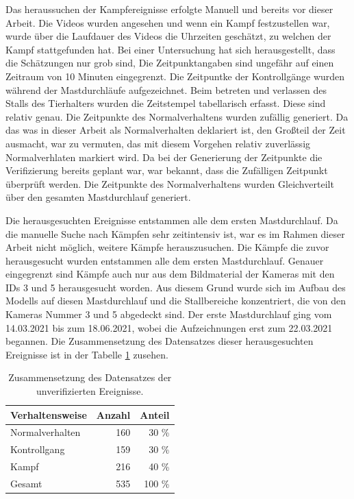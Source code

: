 Das heraussuchen der Kampfereignisse erfolgte Manuell und bereits vor dieser Arbeit. Die Videos wurden angesehen und wenn ein Kampf festzustellen war, wurde über die Laufdauer des Videos die Uhrzeiten geschätzt, zu welchen der Kampf stattgefunden hat. Bei einer Untersuchung hat sich herausgestellt, dass die Schätzungen nur grob sind, Die Zeitpunktangaben sind ungefähr auf einen Zeitraum von 10 Minuten eingegrenzt. Die Zeitpuntke der Kontrollgänge wurden während der Mastdurchläufe aufgezeichnet. Beim betreten und verlassen des Stalls des Tierhalters wurden die Zeitstempel tabellarisch erfasst. Diese sind relativ genau. Die Zeitpunkte des Normalverhaltens wurden zufällig generiert. Da das was in dieser Arbeit als Normalverhalten deklariert ist, den Großteil der Zeit ausmacht, war zu vermuten, das mit diesem Vorgehen relativ zuverlässig Normalverhlaten markiert wird. Da bei der Generierung der Zeitpunkte die Verifizierung bereits geplant war, war bekannt, dass die Zufälligen Zeitpunkt überprüft werden. Die Zeitpunkte des Normalverhaltens wurden Gleichverteilt über den gesamten Mastdurchlauf generiert.\par

Die herausgesuchten Ereignisse entstammen alle dem ersten Mastdurchlauf. Da die manuelle Suche nach Kämpfen sehr zeitintensiv ist, war es im Rahmen dieser Arbeit nicht möglich, weitere Kämpfe herauszusuchen. Die Kämpfe die zuvor herausgesucht wurden entstammen alle dem ersten Mastdurchlauf. Genauer eingegrenzt sind Kämpfe auch nur aus dem Bildmaterial der Kameras mit den IDs 3 und 5 herausgesucht worden. Aus diesem Grund wurde sich im Aufbau des Modells auf diesen Mastdurchlauf und die Stallbereiche konzentriert, die von den Kameras Nummer 3 und 5 abgedeckt sind. Der erste Mastdurchlauf ging vom 14.03.2021 bis zum 18.06.2021, wobei die Aufzeichnungen erst zum 22.03.2021 begannen.  Die Zusammensetzung des Datensatzes dieser herausgesuchten Ereignisse ist in der Tabelle \ref{tab:DataSetUnVeri} zusehen.\par


\begin{table}[ht]
    \centering
    \caption{Zusammensetzung des Datensatzes der unverifizierten Ereignisse.}
    \begin{tabular}{|l|r|r|}
    \hline
        Verhaltensweise & Anzahl & Anteil \\
    \hline
        Normalverhalten & 160 & 30 \%\\
        Kontrollgang & 159 & 30 \%\\
        Kampf & 216 & 40 \%\\
    \hline
    \hline
        Gesamt & 535 & 100 \%\\
    \hline
    \end{tabular}
    \label{tab:DataSetUnVeri}
\end{table}

